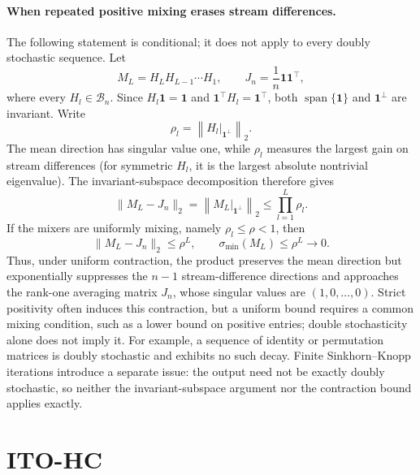 \documentclass{article}
\begin{document}
\paragraph{When repeated positive mixing erases stream differences.}
The following statement is conditional; it does not apply to every doubly stochastic sequence. Let
\begin{equation}
 M_L=H_LH_{L-1}\cdots H_1,
 \qquad J_n=\frac{1}{n}\mathbf 1\mathbf 1^\top,
\end{equation}
where every $H_l\in\mathcal B_n$. Since $H_l\mathbf 1=\mathbf 1$ and $\mathbf 1^\top H_l=\mathbf 1^\top$, both $\operatorname{span}\{\mathbf 1\}$ and $\mathbf 1^\perp$ are invariant. Write
\begin{equation}
 \rho_l=\left\|H_l\big|_{\mathbf 1^\perp}\right\|_2.
 \label{eq:ds-contraction}
\end{equation}
The mean direction has singular value one, while $\rho_l$ measures the largest gain on stream differences (for symmetric $H_l$, it is the largest absolute nontrivial eigenvalue). The invariant-subspace decomposition therefore gives
\begin{equation}
 \|M_L-J_n\|_2
 =\left\|\left. M_L\right|_{\mathbf 1^\perp}\right\|_2
 \leq\prod_{l=1}^{L}\rho_l.
 \label{eq:ds-product-contract}
\end{equation}
If the mixers are uniformly mixing, namely $\rho_l\leq\rho<1$, then
\begin{equation}
 \|M_L-J_n\|_2\leq\rho^L,
 \qquad
 \sigma_{\min}(M_L)\leq\rho^L\longrightarrow0.
 \label{eq:ds-smin-decay}
\end{equation}
Thus, under uniform contraction, the product preserves the mean direction but exponentially suppresses the $n-1$ stream-difference directions and approaches the rank-one averaging matrix $J_n$, whose singular values are $(1,0,\ldots,0)$. Strict positivity often induces this contraction, but a uniform bound requires a common mixing condition, such as a lower bound on positive entries; double stochasticity alone does not imply it. For example, a sequence of identity or permutation matrices is doubly stochastic and exhibits no such decay. Finite Sinkhorn--Knopp iterations introduce a separate issue: the output need not be exactly doubly stochastic, so neither the invariant-subspace argument nor the contraction bound applies exactly.

\section{ITO-HC}
\end{document}
